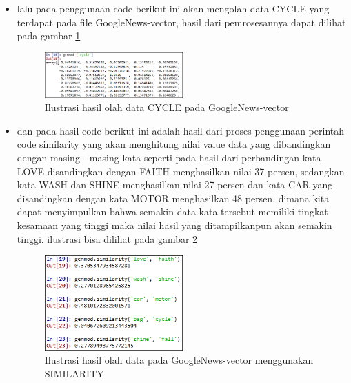 \begin{enumerate}
\begin{itemize}
\item  lalu pada penggunaan code berikut ini akan mengolah data CYCLE yang terdapat pada file GoogleNews-vector, hasil dari pemrosesannya dapat dilihat pada gambar \ref{d18}
\begin{figure}[!htbp]
	\centering
	\includegraphics[width=0.5\textwidth]{figures/fathi/chapter5/hari2/12}
	\caption{Ilustrasi hasil olah data CYCLE pada GoogleNews-vector}
	\label{d18}
\end{figure}

\item  dan pada hasil code berikut ini adalah hasil dari proses penggunaan perintah code similarity yang akan menghitung nilai value data yang dibandingkan dengan masing - masing kata seperti pada hasil dari perbandingan kata LOVE disandingkan dengan FAITH menghasilkan nilai 37 persen, sedangkan kata WASH dan SHINE menghasilkan nilai 27 persen dan kata CAR yang disandingkan dengan kata MOTOR menghasilkan 48 persen, dimana kita dapat menyimpulkan bahwa semakin data kata tersebut memiliki tingkat kesamaan yang tinggi maka nilai hasil yang ditampilkanpun akan semakin tinggi. ilustrasi bisa dilihat pada gambar \ref{d19}
\begin{figure}[!htbp]
	\centering
	\includegraphics[width=0.5\textwidth]{figures/fathi/chapter5/hari2/13}
	\caption{Ilustrasi hasil olah data  pada GoogleNews-vector menggunakan SIMILARITY}
	\label{d19}
\end{figure}
\end{itemize}


\end{enumerate}

